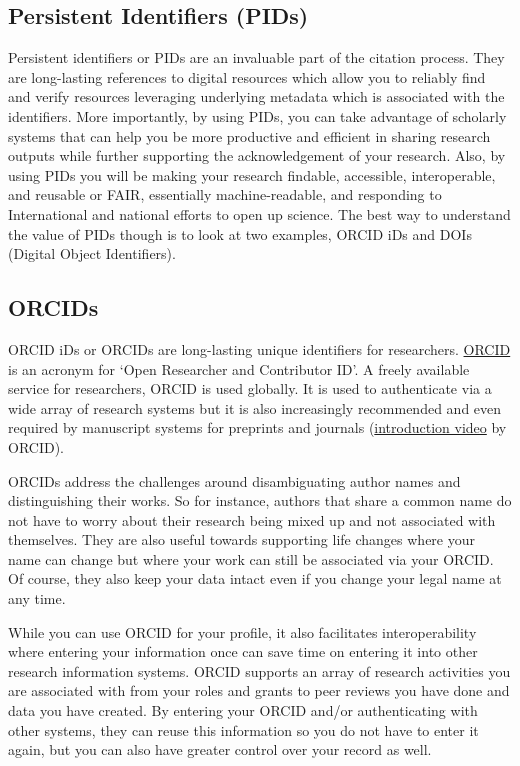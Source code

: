 \documentclass[
  letterpaper,
  DIV=11,
  numbers=noendperiod]{scrreport}
\begin{document}
\hypertarget{persistent-identifiers-pids}{%
\subsection{Persistent Identifiers
(PIDs)}\label{persistent-identifiers-pids}}

Persistent identifiers or PIDs are an invaluable part of the citation
process. They are long-lasting references to digital resources which
allow you to reliably find and verify resources leveraging underlying
metadata which is associated with the identifiers. More importantly, by
using PIDs, you can take advantage of scholarly systems that can help
you be more productive and efficient in sharing research outputs while
further supporting the acknowledgement of your research. Also, by using
PIDs you will be making your research findable, accessible,
interoperable, and reusable or FAIR, essentially machine-readable, and
responding to International and national efforts to open up science. The
best way to understand the value of PIDs though is to look at two
examples, ORCID iDs and DOIs (Digital Object Identifiers).

\hypertarget{orcids}{%
\subsection{ORCIDs}\label{orcids}}

ORCID iDs or ORCIDs are long-lasting unique identifiers for researchers.
\href{https://orcid.org/}{ORCID} is an acronym for `Open Researcher and
Contributor ID'. A freely available service for researchers, ORCID is
used globally. It is used to authenticate via a wide array of research
systems but it is also increasingly recommended and even required by
manuscript systems for preprints and journals
(\href{https://vimeo.com/495762735?embedded=true\&source=video_title\&owner=13723853}{introduction
video} by ORCID).

ORCIDs address the challenges around disambiguating author names and
distinguishing their works. So for instance, authors that share a common
name do not have to worry about their research being mixed up and not
associated with themselves. They are also useful towards supporting life
changes where your name can change but where your work can still be
associated via your ORCID. Of course, they also keep your data intact
even if you change your legal name at any time.

While you can use ORCID for your profile, it also facilitates
interoperability where entering your information once can save time on
entering it into other research information systems. ORCID supports an
array of research activities you are associated with from your roles and
grants to peer reviews you have done and data you have created. By
entering your ORCID and/or authenticating with other systems, they can
reuse this information so you do not have to enter it again, but you can
also have greater control over your record as well.
\end{document}
